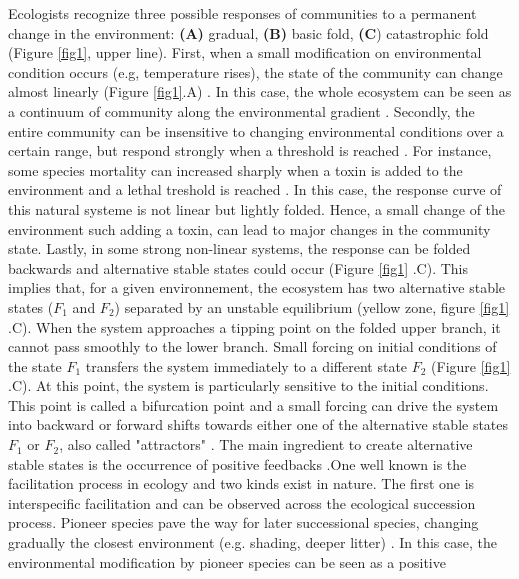 Ecologists recognize three possible responses of communities to a permanent
change in the environment: \textbf{(A)} gradual, \textbf{(B)} basic fold,
\textbf{(C}) catastrophic fold \cite{Scheffer2001} (Figure \ref{fig1}, upper
line). First, when a small modification on environmental condition occurs
(e.g, temperature rises), the state of the community can change almost
linearly (Figure \ref{fig1}.A) \cite{Scheffer2001,Scheffer2009}. In this case,
the whole ecosystem can be seen as a continuum of community along the
environmental gradient \cite{Scheffer2001,Scheffer2009,scheffer2009critical}.
Secondly, the entire community can be insensitive to changing environmental
conditions over a certain range, but respond strongly when a threshold is
reached \cite{scheffer2009critical}. For instance, some species mortality can
increased sharply when a toxin is added to the environment and a lethal
treshold is reached \cite{scheffer2009critical}. In this case, the response
curve of this natural systeme is not linear but lightly folded. Hence, a small
change of the environment such adding a toxin, can lead to major changes in
the  community state. Lastly, in some strong non-linear systems, the response
can be folded backwards and alternative stable states could occur (Figure
\ref{fig1} .C). This implies that, for a given environnement, the ecosystem
has two alternative stable states ($F_1$ and $F_2$) separated by an unstable
equilibrium (yellow zone, figure \ref{fig1} .C). When the system approaches a
tipping point on the folded upper branch, it cannot pass smoothly to the lower
branch. Small forcing on initial conditions of the state $F_1$ transfers the
system immediately to a different state $F_2$ (Figure \ref{fig1} .C). At this
point, the system is particularly sensitive to the initial conditions. This
point is called a bifurcation point and a small forcing can drive the system
into backward or forward shifts towards either one of the alternative stable
states $F_1$ or $F_2$, also called "attractors" \cite{scheffer2009critical}.
The main ingredient to create alternative stable states is the occurrence of
positive feedbacks \cite{scheffer2009critical,Schroder2005}.One well known is
the facilitation process in ecology and two kinds exist in nature. The first
one is interspecific facilitation and can be observed across the ecological
succession process. Pioneer species pave the way for later successional
species, changing gradually the closest environment (e.g. shading, deeper
litter) \cite{scheffer2009critical, Levine2006}. In this case, the
environmental modification by pioneer species can be seen as a positive
